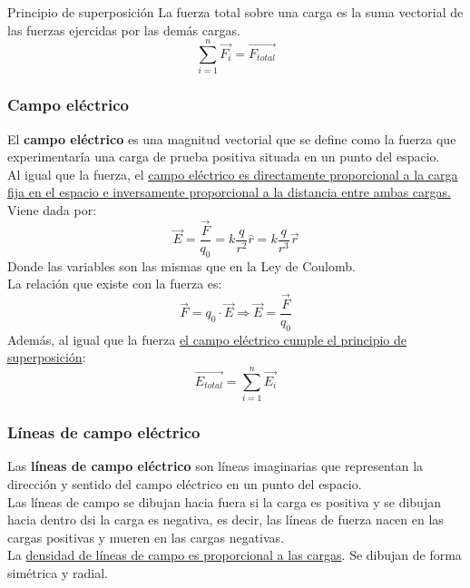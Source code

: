 \begin{teorema}{Principio de superposición}
    La fuerza total sobre una carga es la suma vectorial de las fuerzas ejercidas por las demás cargas.
    $$\sum_{i=1}^{n} \vec{F_i} = \vec{F_{total}}$$
\end{teorema}

\subsubsection{Campo eléctrico}
El \textbf{campo eléctrico} es una magnitud vectorial que se define como la fuerza que experimentaría una carga de prueba positiva situada en un punto del espacio.\\
Al igual que la fuerza, el \uline{campo eléctrico es directamente proporcional a la carga fija en el espacio e inversamente proporcional a la distancia entre ambas cargas.} 
Viene dada por: 
\begin{equation}
    \vec{E} = \frac{\vec{F}}{q_0} = k \frac{q}{r^2} \hat{r} = k \frac{q}{r^3} \vec{r}
\end{equation}
Donde las variables son las mismas que en la Ley de Coulomb.\\
La relación que existe con la fuerza es: 
\begin{equation}
    \vec{F} = q_0 \cdot \vec{E} \Rightarrow \vec{E} = \frac{\vec{F}}{q_0}
\end{equation}
Además, al igual que la fuerza \uline{el campo eléctrico cumple el principio de superposición}: $$\vec{E_{total}} = \sum_{i=1}^{n} \vec{E_i}$$

\subsubsection{Líneas de campo eléctrico}
Las \textbf{líneas de campo eléctrico} son líneas imaginarias que representan la dirección y sentido del campo eléctrico en un punto del espacio.\\
Las líneas de campo se dibujan hacia fuera si la carga es positiva y se dibujan hacia dentro dsi la carga es negativa, es decir, las líneas de fuerza nacen en las cargas positivas y mueren en las cargas negativas. \\
La \uline{densidad de líneas de campo es proporcional a las cargas}. Se dibujan de forma simétrica y radial. \\


